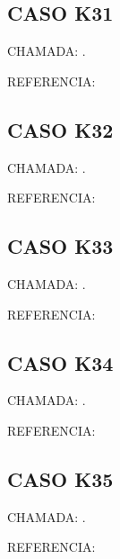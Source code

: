 \documentclass{undftex}
\begin{document}
\begin{refsection}\section*{CASO K31} CHAMADA: . \textcite{k31}\par REFERENCIA:\par\printbibliography[heading=none,check=undfconsultadas]\end{refsection}\clearpage
\begin{refsection}\section*{CASO K32} CHAMADA: . \textcite{k32}\par REFERENCIA:\par\printbibliography[heading=none,check=undfconsultadas]\end{refsection}\clearpage
\begin{refsection}\section*{CASO K33} CHAMADA: . \textcite{k33}\par REFERENCIA:\par\printbibliography[heading=none,check=undfconsultadas]\end{refsection}\clearpage
\begin{refsection}\section*{CASO K34} CHAMADA: . \textcite{k34}\par REFERENCIA:\par\printbibliography[heading=none,check=undfconsultadas]\end{refsection}\clearpage
\begin{refsection}\section*{CASO K35} CHAMADA: . \textcite{k18a}\par REFERENCIA:\par\printbibliography[heading=none,check=undfconsultadas]\end{refsection}\clearpage
\end{document}
